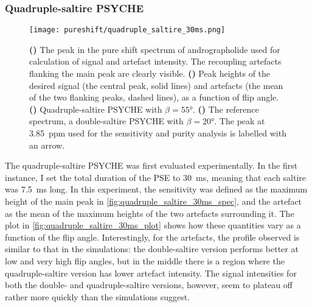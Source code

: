 \subsubsection{Quadruple-saltire PSYCHE}

\begin{figure}[htb]
    \centering
    \texttt{[image: pureshift/quadruple\_saltire\_30ms.png]}%
    {\label{fig:quadruple_saltire_30ms_spec}}%
    {\label{fig:quadruple_saltire_30ms_plot}}%
    {\label{fig:quadruple_saltire_30ms_maybebetter}}%
    {\label{fig:quadruple_saltire_30ms_reference}}%
    \caption[Comparison of 30 ms double saltire and 30 ms quadruple saltire]{
        \textbf{()} The peak in the pure shift spectrum of andrographolide used for calculation of signal and artefact intensity.
        The recoupling artefacts flanking the main peak are clearly visible.
        \textbf{()} Peak heights of the desired signal (the central peak, solid lines) and artefacts (the mean of the two flanking peaks, dashed lines), as a function of flip angle.
        \textbf{()} Quadruple-saltire PSYCHE with $\beta = \ang{55}$.
        \textbf{()} The reference spectrum, a double-saltire PSYCHE with $\beta = \ang{20}$.
        The peak at \qty{3.85}{ppm} used for the sensitivity and purity analysis is labelled with an arrow.
    }
    \label{fig:quadruple_saltire_30ms}
\end{figure}

The quadruple-saltire PSYCHE was first evaluated experimentally.
In the first instance, I set the total duration of the PSE to \qty{30}{\ms}, meaning that each saltire was \qty{7.5}{\ms} long.
In this experiment, the sensitivity was defined as the maximum height of the main peak in \cref{fig:quadruple_saltire_30ms_spec}, and the artefact as the mean of the maximum heights of the two artefacts surrounding it.
The plot in \cref{fig:quadruple_saltire_30ms_plot} shows how these quantities vary as a function of the flip angle.
Interestingly, for the artefacts, the profile observed is similar to that in the simulations: the double-saltire version performs better at low and very high flip angles, but in the middle there is a region where the quadruple-saltire version has lower artefact intensity.
The signal intensities for both the double- and quadruple-saltire versions, however, seem to plateau off rather more quickly than the simulations suggest.

